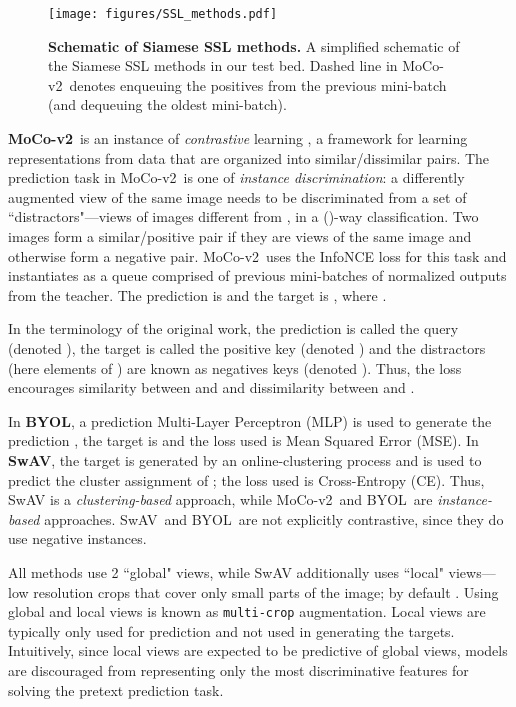 \documentclass[twoside,11pt]{article}
\newcommand{\moco}{MoCo-v2}
\newcommand{\byol}{BYOL}
\newcommand{\swav}{SwAV}
\begin{document}
\begin{figure}
    \centering
    \texttt{[image: figures/SSL\_methods.pdf]}
    \caption{ \textbf{Schematic of Siamese SSL methods.} A simplified schematic of the Siamese SSL methods in our test bed. Dashed line in \moco~denotes enqueuing the positives  from the previous mini-batch (and dequeuing the oldest mini-batch).}
    \label{fig:ssl_methods_summary}
\end{figure}

\textbf{\moco}~is an instance of \textit{contrastive} learning \citep{hadsell_dimensionality_2006}, a framework for learning representations from data that are organized into similar/dissimilar pairs. The prediction task in \moco~is one of \textit{instance discrimination}: a differently augmented view of the same image  needs to be discriminated from a set  of ``distractors"---views of images different from , in a ()-way classification. Two images form a similar/positive pair if they are views of the same image and otherwise form a negative pair. \moco~uses the InfoNCE \citep{infonce_2018} loss for this task and instantiates  as a queue comprised of previous mini-batches of  normalized outputs from the teacher. The prediction is  and the target is , where .

In the terminology of the original work, the prediction  is called the query (denoted ), the target  is called the positive key (denoted ) and the distractors (here elements of ) are known as negatives keys (denoted ). Thus, the loss encourages similarity between  and  and dissimilarity between  and . 

 In \textbf{BYOL}, a prediction Multi-Layer Perceptron (MLP)  is used to generate the prediction , the target is  and the loss used is Mean Squared Error (MSE). In \textbf{SwAV}, the target is generated by an online-clustering process and  is used to predict the cluster assignment of ; the loss used is Cross-Entropy (CE). Thus, SwAV is a \textit{clustering-based} approach, while \moco~and \byol~are \textit{instance-based} approaches. \swav~and \byol~are not explicitly contrastive, since they do use negative instances.

All methods use 2 ``global" views, while SwAV additionally uses  ``local" views---low resolution crops that cover only small parts of the image; by default . Using global and local views is known as \texttt{multi-crop} augmentation. Local views are typically only used for prediction and not used in generating the targets. Intuitively, since local views are expected to be predictive of global views, models are discouraged from representing only the most discriminative features for solving the pretext prediction task.
\end{document}
